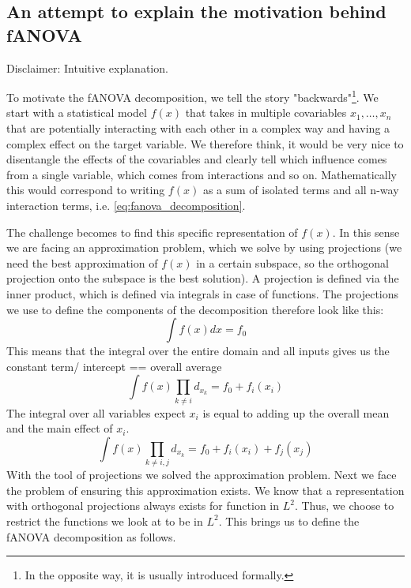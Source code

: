 \subsection*{An attempt to explain the motivation behind fANOVA}
Disclaimer: Intuitive explanation.\par
To motivate the fANOVA decomposition, we tell the story "backwards"\footnote{In the opposite way, it is usually introduced formally.}.
We start with a statistical model $f(x)$ that takes in multiple covariables $x_1,\dots, x_n$ that are potentially interacting with each other in a complex way and having a complex effect on the target variable. We therefore think, it would be very nice to disentangle the effects of the covariables and clearly tell which influence comes from a single variable, which comes from interactions and so on.
Mathematically this would correspond to writing $f(x)$ as a sum of isolated terms and all n-way interaction terms, i.e. \autoref{eq:fanova_decomposition}.\par
The challenge becomes to find this specific representation of $f(x)$. In this sense we are facing an approximation problem, which we solve by using projections (we need the best approximation of $f(x)$ in a certain subspace, so the orthogonal projection onto the subspace is the best solution). A projection is defined via the inner product, which is defined via integrals in case of functions. The projections we use to define the components of the decomposition therefore look like this:
\begin{equation}
    \int f(x) dx = f_0
\end{equation}
This means that the integral over the entire domain and all inputs gives us the constant term/ intercept == overall average
\begin{equation}
    \int f(x) \prod_{k \neq i} d_{x_{k}} = f_0 + f_i(x_i)
\end{equation}
The integral over all variables expect $x_i$ is equal to adding up the overall mean and the main effect of $x_i$.
\begin{equation}
    \int f(x) \prod_{k \neq i,j} d_{x_{k}} = f_0 + f_i(x_i) + f_j(x_j)
\end{equation}
With the tool of projections we solved the approximation problem. Next we face the problem of ensuring this approximation exists. We know that a representation with orthogonal projections always exists for function in $L^2$. Thus, we choose to restrict the functions we look at to be in $L^2$. This brings us to define the fANOVA decomposition as follows.\par




